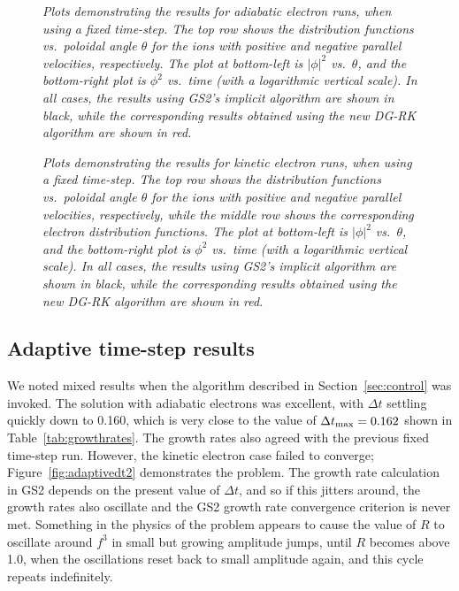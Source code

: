 \documentclass[10pt,a4paper]{article}
\begin{document}
\begin{figure}[!p]
  \begin{center}
  \end{center}
  \caption{\textit{Plots demonstrating the results for adiabatic electron
      runs, when using a fixed time-step. The top row shows the distribution
      functions vs.\ poloidal angle $\theta$ for the ions with positive and
      negative parallel velocities, respectively. The plot at bottom-left is
      $|\phi|^2$ vs.\ $\theta$, and the bottom-right plot is $\phi^2$ vs.\
      time (with a logarithmic vertical scale). In all cases, the results
      using GS2's implicit algorithm are shown in black, while the
      corresponding results obtained using the new DG-RK algorithm are shown
      in red.}
    \label{fig:ae_results} }
\end{figure}

\begin{figure}[!p]
  \begin{center}
  \end{center}
  \caption{\textit{Plots demonstrating the results for kinetic electron runs,
      when using a fixed time-step. The top row shows the distribution
      functions vs.\ poloidal angle $\theta$ for the ions with positive and
      negative parallel velocities, respectively, while the middle row shows
      the corresponding electron distribution functions. The plot at
      bottom-left is $|\phi|^2$ vs.\ $\theta$, and the bottom-right plot is
      $\phi^2$ vs.\ time (with a logarithmic vertical scale). In all cases,
      the results using GS2's implicit algorithm are shown in black, while the
      corresponding results obtained using the new DG-RK algorithm are shown
      in red.}
    \label{fig:ke_results} }
\end{figure}

\subsection{Adaptive time-step results}

We noted mixed results when the algorithm described in
Section~\ref{sec:control} was invoked. The solution with adiabatic electrons
was excellent, with $\Delta t$ settling quickly down to 0.160, which is very
close to the value of $\Delta t_{\mbox{\scriptsize max}} = 0.162$ shown in
Table~\ref{tab:growthrates}. The growth rates also agreed with the previous
fixed time-step run. However, the kinetic electron case failed to converge;
Figure~\ref{fig:adaptivedt2} demonstrates the problem. The growth rate
calculation in GS2 depends on the present value of $\Delta t$, and so if this
jitters around, the growth rates also oscillate and the GS2 growth rate
convergence criterion is never met. Something in the physics of the problem
appears to cause the value of $R$ to oscillate around $f^3$ in small but
growing amplitude jumps, until $R$ becomes above 1.0, when the oscillations
reset back to small amplitude again, and this cycle repeats indefinitely.
\end{document}
